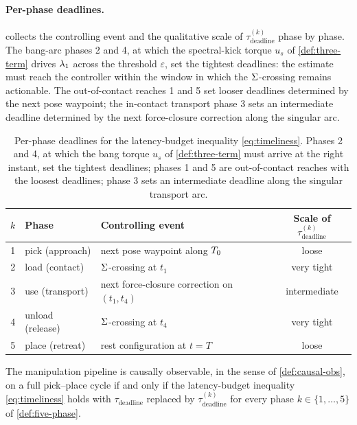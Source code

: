 \paragraph{Per-phase deadlines.}
 collects the controlling event and
the qualitative scale of $\tau_{\mathrm{deadline}}^{(k)}$ phase by
phase. The bang-arc phases 2 and 4, at which the spectral-kick
torque $u_{s}$ of \cref{def:three-term} drives $\lambda_{1}$ across
the threshold $\varepsilon$, set the tightest deadlines: the
estimate must reach the controller within the window in which the
$\Sigma$-crossing remains actionable. The out-of-contact reaches
1 and 5 set looser deadlines determined by the next pose
waypoint; the in-contact transport phase 3 sets an intermediate
deadline determined by the next force-closure correction along
the singular arc.

\begin{table}[h]
\centering
\small
\begin{tabular}{@{}cllc@{}}
\toprule
$k$ & Phase & Controlling event & Scale of $\tau_{\mathrm{deadline}}^{(k)}$ \\
\midrule
1 & pick (approach)            & next pose waypoint along $T_{0}$        & loose \\
2 & load (contact)             & $\Sigma$-crossing at $t_{1}$                 & very tight \\
3 & use (transport)            & next force-closure correction on $(t_{1}, t_{4})$ & intermediate \\
4 & unload (release)           & $\Sigma$-crossing at $t_{4}$                 & very tight \\
5 & place (retreat)            & rest configuration at $t = T$                 & loose \\
\bottomrule
\end{tabular}
\caption{Per-phase deadlines for the latency-budget inequality
\eqref{eq:timeliness}. Phases 2 and 4, at which the bang torque
$u_{s}$ of \cref{def:three-term} must arrive at the right
instant, set the tightest deadlines; phases 1 and 5 are out-of-contact
reaches with the loosest deadlines; phase 3 sets an intermediate
deadline along the singular transport arc.}
\label{tab:per-phase-deadlines}
\end{table}

\begin{proposition}
\label{prop:per-phase-timeliness}
The manipulation pipeline is causally observable, in the sense of
\cref{def:causal-obs}, on a full pick--place cycle if and only if
the latency-budget inequality \eqref{eq:timeliness} holds with
$\tau_{\mathrm{deadline}}$ replaced by
$\tau_{\mathrm{deadline}}^{(k)}$ for every phase
$k \in \{1, \ldots, 5\}$ of \cref{def:five-phase}.
\end{proposition}

